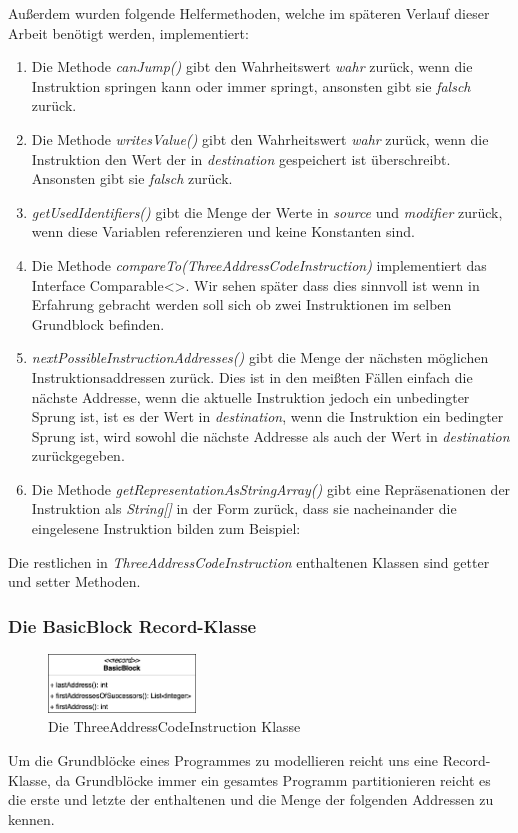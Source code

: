 \newpage
Außerdem wurden folgende Helfermethoden, welche im späteren Verlauf dieser Arbeit
benötigt werden, implementiert:
\begin{enumerate}
  \item Die Methode \textit{canJump()} gibt den Wahrheitswert \textit{wahr} zurück, wenn die
    Instruktion springen kann oder immer springt, ansonsten gibt sie \textit{falsch} zurück.
  \item Die Methode \textit{writesValue()} gibt den Wahrheitswert \textit{wahr} zurück,
    wenn die Instruktion den Wert der in \textit{destination} gespeichert ist überschreibt.
    Ansonsten gibt sie \textit{falsch} zurück.
  \item \textit{getUsedIdentifiers()} gibt die Menge der Werte in \textit{source} und \textit{modifier} zurück,
    wenn diese Variablen referenzieren und keine Konstanten sind.
  \item Die Methode \textit{compareTo(ThreeAddressCodeInstruction)} implementiert das Interface
    Comparable<>. Wir sehen später dass dies sinnvoll ist wenn in Erfahrung gebracht werden
    soll sich ob zwei Instruktionen im selben Grundblock befinden.
  \item \textit{nextPossibleInstructionAddresses()} gibt die Menge der nächsten möglichen 
    Instruktionsaddressen zurück. Dies ist in den meißten Fällen einfach die nächste
    Addresse, wenn die aktuelle Instruktion jedoch ein unbedingter Sprung ist, ist es der
    Wert in \textit{destination}, wenn die Instruktion ein bedingter Sprung ist, wird sowohl die
    nächste Addresse als auch der Wert in \textit{destination} zurückgegeben.
  \item Die Methode \textit{getRepresentationAsStringArray()} gibt
    eine Repräsenationen der Instruktion als \textit{String[]} in der Form zurück, 
    dass sie nacheinander die eingelesene Instruktion bilden zum Beispiel:
\end{enumerate}
Die restlichen in \textit{ThreeAddressCodeInstruction} enthaltenen Klassen sind getter und setter Methoden.

\subsubsection{Die BasicBlock Record-Klasse}
\begin{figure}
  \vspace{-15pt}
  \centering
  \includegraphics[width=0.35\textwidth]{fig/3AC_BasicBlock_methods.png}
  \caption{Die ThreeAddressCodeInstruction Klasse}
  \label{fig:BasicBlock}
\end{figure}
Um die Grundblöcke eines Programmes zu modellieren reicht uns eine Record-Klasse,
da Grundblöcke immer ein gesamtes Programm partitionieren reicht es die erste und 
letzte der enthaltenen und die Menge der folgenden Addressen zu kennen.\\


